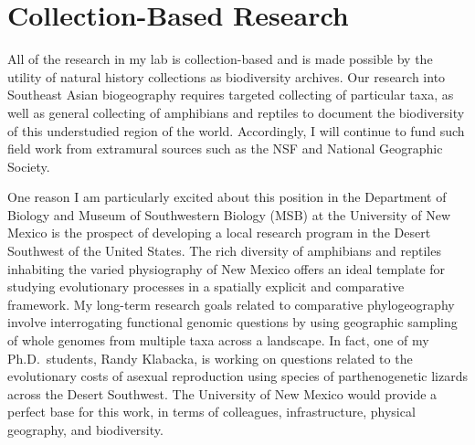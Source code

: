\documentclass[10pt]{article}
\begin{document}
\section*{Collection-Based Research}
All of the research in my lab is collection-based and is made possible by the
utility of natural history collections as biodiversity archives.
Our research into Southeast Asian biogeography requires targeted collecting of
particular taxa, as well as general collecting of amphibians and reptiles to
document the biodiversity of this understudied region of the world.
Accordingly, I will continue to fund such field work from extramural sources
such as the NSF and National Geographic Society.

One reason I am particularly excited about this position in the
Department of Biology
and Museum of Southwestern Biology (MSB)
at the University of New Mexico
is the prospect of developing
a local research program in the
Desert Southwest of the United States.
The rich diversity of amphibians and reptiles inhabiting the varied
physiography of New Mexico offers an ideal template for studying evolutionary
processes in a spatially explicit and comparative framework.
My long-term research goals related to comparative phylogeography involve
interrogating functional genomic questions by using geographic sampling of
whole genomes from multiple taxa across a landscape.
In fact, one of my Ph.D.\ students, Randy Klabacka, is working on questions
related to the evolutionary costs of asexual reproduction using species of
parthenogenetic lizards across the Desert Southwest.
The University of New Mexico would provide a perfect base for this work, in
terms of colleagues, infrastructure, physical geography, and biodiversity.
\end{document}
